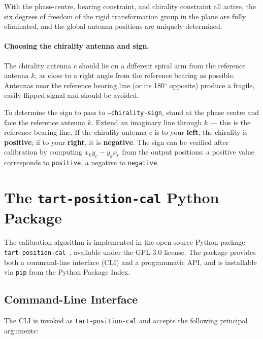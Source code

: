 \documentclass[twocolumn, a4paper,10pt]{article}
\begin{document}
With the phase-centre, bearing constraint, and chirality constraint all active, the six degrees of freedom of the rigid transformation group in the plane are fully eliminated, and the global antenna positions are uniquely determined.

\paragraph{Choosing the chirality antenna and sign.}
The chirality antenna $c$ should lie on a different spiral arm from the reference antenna $k$, as close to a right angle from the reference bearing as possible.  Antennas near the reference bearing line (or its 180$^\circ$ opposite) produce a fragile, easily-flipped signal and should be avoided.

To determine the sign to pass to \texttt{--chirality-sign}, stand at the phase centre and face the reference antenna $k$.  Extend an imaginary line through $k$ --- this is the reference bearing line.  If the chirality antenna $c$ is to your \textbf{left}, the chirality is \textbf{positive}; if to your \textbf{right}, it is \textbf{negative}.  The sign can be verified after calibration by computing $x_k y_c - y_k x_c$ from the output positions: a positive value corresponds to \texttt{positive}, a negative to \texttt{negative}.

\section{The \texttt{tart-position-cal} Python Package}
\label{sec:software}

The calibration algorithm is implemented in the open-source Python package \texttt{tart-position-cal}~\cite{moltento2026tartpositioncal}, available under the GPL-3.0 license. The package provides both a command-line interface (CLI) and a programmatic API, and is installable via \texttt{pip} from the Python Package Index.

\subsection{Command-Line Interface}

The CLI is invoked as \texttt{tart-position-cal} and accepts the following principal arguments:
\end{document}
